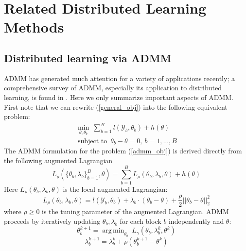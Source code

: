 \documentclass{article}
\DeclareMathOperator*{\argmin}{arg\,min}
\DeclareMathOperator*{\st}{subject~to}
\newcommand{\1}[0]{\ensuremath{\boldsymbol{1}}\xspace}
\begin{document}

\section{Related Distributed Learning Methods}

\subsection{Distributed learning via ADMM}
\label{ADMM}
ADMM has generated much attention for a variety of applications recently; a comprehensive survey of ADMM, especially its application to distributed learning, is found in \cite{Boyd10}. Here we only summarize important aspects of ADMM. First note that we can rewrite (\ref{general_obj}) into the following equivalent problem:
\begin{equation}\label{admm_obj}
\begin{gathered}
\min_{\theta, \theta_b} ~ \textstyle\sum_{b=1}^Bl(\mathcal{Y}_b,\theta_b) + h(\theta)\\
\st ~ \theta_b - \theta = 0, ~ b = 1,\ldots,B
\end{gathered}
\end{equation}
The ADMM formulation for the problem (\ref{admm_obj}) is derived directly from the following augmented Lagrangian
\begin{equation}\label{admm_lag_global}
\textstyle L_\rho(\{\theta_b, \lambda_b\}_{b=1}^B, \theta) =  \sum_{b=1}^BL_\rho(\theta_b, \lambda_b, \theta) + h(\theta)
\end{equation}
Here $L_\rho(\theta_b, \lambda_b, \theta)$ is the local augmented Lagrangian:
\begin{equation}\label{admm_lag_local}
\textstyle L_\rho(\theta_b, \lambda_b, \theta)  = l(\mathcal{Y}_b, \theta_b) + \lambda_b\cdot(\theta_b - \theta) + \frac{\rho}{2}||\theta_b - \theta||_2^2
\end{equation}
where $\rho \ge 0$ is the tuning parameter of the augmented Lagrangian. ADMM proceeds by iteratively updating $\theta_b, \lambda_b$ for each block $b$ independently and $\theta$:
\begin{equation}\label{admm_update_local}
\textstyle \theta_b^{k+1} = \argmin_{\theta_b}~L_\gamma(\theta_b, \lambda_b^k, \theta^k)
\end{equation}
\begin{equation}\label{admm_update_lag}
\textstyle \lambda_b^{k+1} = \lambda_b^k + \rho(\theta_b^{k+1} - \theta^{k})
\end{equation}
\end{document}
